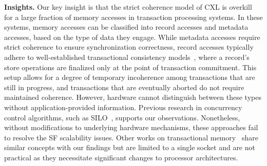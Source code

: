
\hspace*{\fill}

\noindent \textbf{Insights. }
Our key insight is that the strict coherence model of CXL is overkill for a large fraction of memory accesses in transaction processing systems. In these systems, memory accesses can be classified into record accesses and metadata accesses, based on the type of data they engage. While metadata accesses require strict coherence to ensure synchronization correctness, record accesses typically adhere to well-established transactional consistency models~\cite{rss_sosp21, tcc_isca04, sitm_asplos14}, where a record’s store operations are finalized only at the point of transaction commitment. This setup allows for a degree of temporary incoherence among transactions that are still in progress, and transactions that are eventually aborted do not require maintained coherence. However, hardware cannot distinguish between these types without application-provided information. Previous research in concurrency control algorithms, such as SILO~\cite{silo_sosp13}, supports our observations. Nonetheless, without modifications to underlying hardware mechanisms, these approaches fail to resolve the SF scalability issues. Other works on transactional memory~\cite{logtm_hpca06, overlaytm_pact19, flextm_isca08, vtm_isca05} share similar concepts with our findings but are limited to a single socket and are not practical as they necessitate significant changes to processor architectures. 

